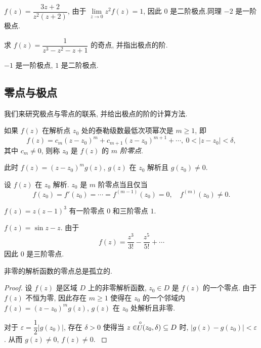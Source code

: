 \documentclass[nocolor,theme=doremi,lang=cn,11pt,chinese,twoside,openright,usesamecnt]{elegantbook}
\begin{document}
\begin{example}
		$f(z)=\dfrac{3z+2}{z^2(z+2)}$,
	{由于 $\lim\limits_{z\to 0}z^2f(z)=1$, 因此 $0$ 是二阶极点.同理 $-2$ 是一阶极点.
	}
\end{example}

\begin{exercise}
	求 $f(z)=\dfrac1{z^3-z^2-z+1}$ 的奇点, 并指出极点的阶.
\end{exercise}

\begin{answer}
	$-1$ 是一阶极点, $1$ 是二阶极点.
\end{answer}

\subsection{零点与极点}

我们来研究极点与零点的联系, 并给出极点的阶的计算方法.
\begin{definition}
	如果 $f(z)$ 在解析点 $z_0$ 处的泰勒级数最低次项幂次是 $m\ge1$, 即
	\[f(z)=c_m(z-z_0)^m+c_{m+1}(z-z_0)^{m+1}+\cdots,\ 0<|z-z_0|<\delta,\]
	其中 $c_m\neq 0$, 则称 $z_0$ 是 $f(z)$ 的 \emph{$m$ 阶零点}.
\end{definition}

此时 $f(z)=(z-z_0)^mg(z)$, $g(z)$ 在 $z_0$ 解析且 $g(z_0)\neq 0$.

\begin{theorem}
	设 $f(z)$ 在 $z_0$ 解析.
	$z_0$ 是 $m$ 阶零点当且仅当
	\[f(z_0)=f'(z_0)=\cdots=f^{(m-1)}(z_0)=0,\quad
	f^{(m)}(z_0)\neq 0.\]
\end{theorem}

\begin{example}
		$f(z)=z(z-1)^3$
	{有一阶零点 $0$ 和三阶零点 $1$.
	}
\end{example}

\begin{example}
		$f(z)=\sin z-z$.
	{由于
		\[f(z)=\frac{z^3}{3!}-\frac{z^5}{5!}+\cdots\]
		因此 $0$ 是三阶零点.
	}
\end{example}

\begin{theorem}
非零的解析函数的零点总是孤立的.
\end{theorem}

\begin{proof}
	设 $f(z)$ 是区域 $D$ 上的非零解析函数, $z_0\in D$ 是 $f(z)$ 的一个零点.
{%
	由于 $f(z)$ 不恒为零, 因此存在 $m\ge 1$ 使得在 $z_0$ 的一个邻域内 $f(z)=(z-z_0)^m g(z)$, $g(z)$ 在 $z_0$ 处解析且非零.
}

{
	对于 $\varepsilon=\dfrac12|g(z_0)|$, 存在 $\delta>0$ 使得当 $z\in \stackrel{\circ}{U}\!\!(z_0,\delta)\subseteq D$ 时, $|g(z)-g(z_0)|<\varepsilon$.
}%
{%
	从而 $g(z)\neq0$, $f(z)\neq 0$.\qedhere
}
\end{proof}
\end{document}
